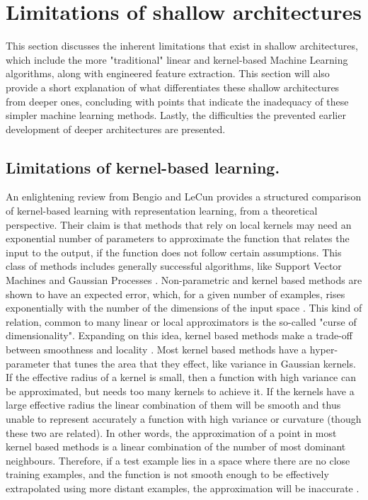 \documentclass[a4paper]{article}
\begin{document}
	
\section{Limitations of shallow architectures}
\label{sec:Limitations}
	This section discusses the inherent limitations that exist in shallow architectures, which include the more "traditional" linear and kernel-based Machine Learning algorithms, along with engineered feature extraction. This section will also provide a short explanation of what differentiates these shallow architectures from deeper ones, concluding with points that indicate the inadequacy of these simpler machine learning methods. Lastly, the difficulties the prevented earlier development of deeper architectures are presented.
	
	\subsection{Limitations of kernel-based learning.}
	\label{sub: kernel limitations}
		An enlightening review from Bengio and LeCun \cite{Bengio2007} provides a structured comparison of kernel-based learning with representation learning, from a theoretical perspective. Their claim is that methods that rely on local kernels may need an exponential number of parameters to approximate the function that relates the input to the output, if the function does not follow certain assumptions. This class of methods includes generally successful algorithms, like Support Vector Machines \cite{Boser1992,Cortes1995} and Gaussian Processes \cite{Williams2006}.
		Non-parametric and kernel based methods are shown to have an expected error, which, for a given number of examples, rises exponentially with the number of the dimensions of the input space \cite{Hardle2004}. This kind of relation, common to many linear or local approximators is the so-called "curse of dimensionality".
		Expanding on this idea, kernel based methods make a trade-off between smoothness and locality \cite{Bengio2007}. Most kernel based methods have a hyper-parameter that tunes the area that they effect, like variance in Gaussian kernels. If the effective radius of a kernel is small, then a function with high variance can be approximated, but needs too many kernels to achieve it. If the kernels have a large effective radius the linear combination of them will be smooth and thus unable to represent accurately a function with high variance or curvature (though these two are related). In other words, the approximation of a point in most kernel based methods is a linear combination of the number of most dominant neighbours. Therefore, if a test example lies in a space where there are no close training examples, and the function is not smooth enough to be effectively extrapolated using more distant examples, the approximation will be inaccurate \cite{Bengio2013a}.
		
\end{document}
